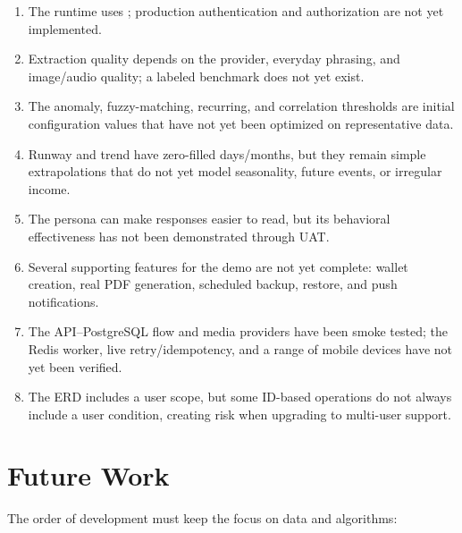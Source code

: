 \begin{enumerate}
  \item The runtime uses ; production authentication and authorization are not yet implemented.
  \item Extraction quality depends on the provider, everyday phrasing, and image/audio quality; a labeled benchmark does not yet exist.
  \item The anomaly, fuzzy-matching, recurring, and correlation thresholds are initial configuration values that have not yet been optimized on representative data.
  \item Runway and trend have zero-filled days/months, but they remain simple extrapolations that do not yet model seasonality, future events, or irregular income.
  \item The persona can make responses easier to read, but its behavioral effectiveness has not been demonstrated through UAT.
  \item Several supporting features for the demo are not yet complete: wallet creation, real PDF generation, scheduled backup, restore, and push notifications.
  \item The API--PostgreSQL flow and media providers have been smoke tested; the Redis worker, live retry/idempotency, and a range of mobile devices have not yet been verified.
  \item The ERD includes a user scope, but some ID-based operations do not always include a user condition, creating risk when upgrading to multi-user support.
\end{enumerate}

\section{Future Work}

The order of development must keep the focus on data and algorithms:

